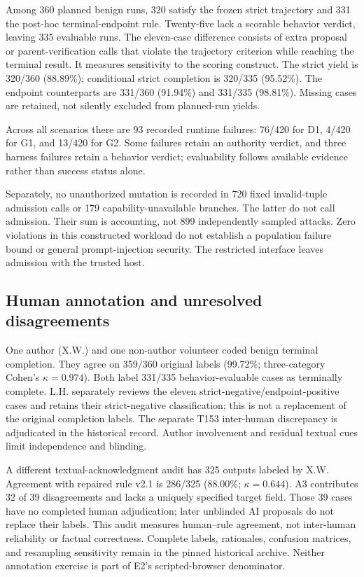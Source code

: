 \documentclass[11pt,a4paper]{article}
\begin{document}
Among 360 planned benign runs, 320 satisfy the frozen strict trajectory and 331 the post-hoc terminal-endpoint rule. Twenty-five lack a scorable behavior verdict, leaving 335 evaluable runs. The eleven-case difference consists of extra proposal or parent-verification calls that violate the trajectory criterion while reaching the terminal result. It measures sensitivity to the scoring construct. The strict yield is 320/360 (88.89\%); conditional strict completion is 320/335 (95.52\%). The endpoint counterparts are 331/360 (91.94\%) and 331/335 (98.81\%). Missing cases are retained, not silently excluded from planned-run yields.



Across all scenarios there are 93 recorded runtime failures: 76/420 for D1, 4/420 for G1, and 13/420 for G2. Some failures retain an authority verdict, and three harness failures retain a behavior verdict; evaluability follows available evidence rather than success status alone.



Separately, no unauthorized mutation is recorded in 720 fixed invalid-tuple admission calls or 179 capability-unavailable branches. The latter do not call admission. Their sum is accounting, not 899 independently sampled attacks. Zero violations in this constructed workload do not establish a population failure bound or general prompt-injection security. The restricted interface leaves admission with the trusted host.

\subsection{Human annotation and unresolved disagreements}

One author (X.W.) and one non-author volunteer coded benign terminal completion. They agree on 359/360 original labels (99.72\%; three-category Cohen's $\kappa=0.974$). Both label 331/335 behavior-evaluable cases as terminally complete. L.H. separately reviews the eleven strict-negative/endpoint-positive cases and retains their strict-negative classification; this is not a replacement of the original completion labels. The separate T153 inter-human discrepancy is adjudicated in the historical record. Author involvement and residual textual cues limit independence and blinding.

A different textual-acknowledgment audit has 325 outputs labeled by X.W. Agreement with repaired rule v2.1 is 286/325 (88.00\%; $\kappa=0.644$). A3 contributes 32 of 39 disagreements and lacks a uniquely specified target field. Those 39 cases have no completed human adjudication; later unblinded AI proposals do not replace their labels. This audit measures human--rule agreement, not inter-human reliability or factual correctness. Complete labels, rationales, confusion matrices, and resampling sensitivity remain in the pinned historical archive. Neither annotation exercise is part of E2's scripted-browser denominator.




\end{document}

